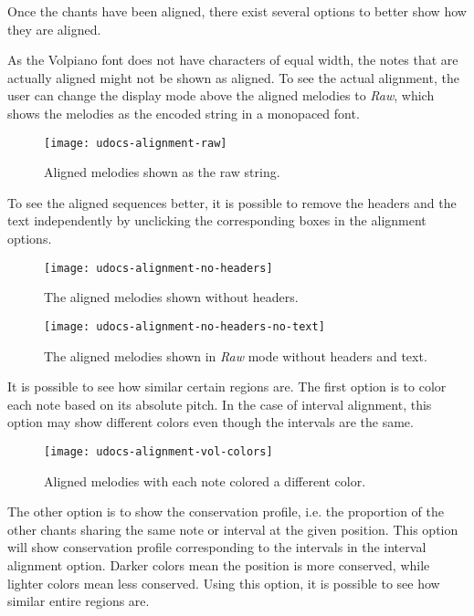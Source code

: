 Once the chants have been aligned, there exist several options to better show how they are aligned.

As the Volpiano font does not have characters of equal width, the notes that are actually aligned might not be shown as aligned. To see the
actual alignment, the user can change the display mode above the aligned melodies to \emph{Raw}, which shows the melodies as the encoded string
in a monopaced font.

\begin{figure}[!h]
\centering
\texttt{[image: udocs-alignment-raw]}
\caption{Aligned melodies shown as the raw string.}
\label{fig:align-raw}
\end{figure}

To see the aligned sequences better, it is possible to remove the headers and the text independently by unclicking the corresponding boxes
in the alignment options.

\begin{figure}[!h]
\centering
\texttt{[image: udocs-alignment-no-headers]}
\caption{The aligned melodies shown without headers.}
\label{fig:align-no-headers}
\end{figure}

\begin{figure}[!h]
\centering
\texttt{[image: udocs-alignment-no-headers-no-text]}
\caption{The aligned melodies shown in \emph{Raw} mode without headers and text.}
\label{fig:align-no-text}
\end{figure}

It is possible to see how similar certain regions are. The first option is to color each note based on its absolute pitch. In the case of interval alignment,
this option may show different colors even though the intervals are the same.

\begin{figure}[!h]
\centering
\texttt{[image: udocs-alignment-vol-colors]}
\caption{Aligned melodies with each note colored a different color.}
\label{fig:align-colors}
\end{figure}

The other option is to show the conservation profile, i.e. the proportion of the other chants sharing the same note or interval at the given position. This option will show
conservation profile corresponding to the intervals in the interval alignment option. Darker colors mean the position is more conserved, while lighter colors mean less conserved.
Using this option, it is possible to see how similar entire regions are.

